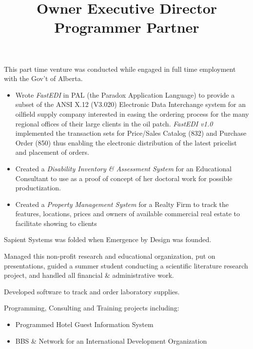 \begin{resume}
\title{ Owner }
\begin{position}
This part time venture was conducted while engaged in full time employment 
with the Gov't of Alberta.
\begin{itemize}
\item Wrote {\it FastEDI} in PAL (the Paradox Application Language)  to 
	provide a subset of the 
	ANSI X.12 (V3.020) Electronic Data Interchange system for an 
	oilfield supply company interested in easing the ordering process for
	the many regional offices of their large clients in the oil patch.  
	{\it FastEDI v1.0} implemented 
	the transaction sets for Price/Sales Catalog (832) and
	Purchase Order (850) thus enabling the electronic distribution 
	of the latest pricelist and placement of orders.
\item Created a {\it Disability Inventory \& Assessment System }
	for an Educational Consultant to use as a proof of concept of
	her doctoral work for possible productization.
\item Created a {\it Property Management System} for a Realty Firm to
	track the features, locations, prices and owners of 
	available commercial real estate to facilitate showing to clients
\end{itemize}
Sapient Systems was folded when Emergence by Design was founded.
\end{position}



\title{ Executive Director }
\begin{position}
Managed this non-profit research and educational organization, put on presentations,
guided a summer student conducting a scientific literature research project,
and handled all financial \& administrative work.
\end{position}



\title{ Programmer }
\begin{position}
Developed software to track and order laboratory supplies.
\end{position}



\title{ Partner }
\begin{position}
Programming, Consulting and Training projects including:
\begin{itemize}
\item Programmed Hotel Guest Information System
\item BBS \& Network for an International Development Organization
\end{itemize}


\end{position}
\end{resume}
